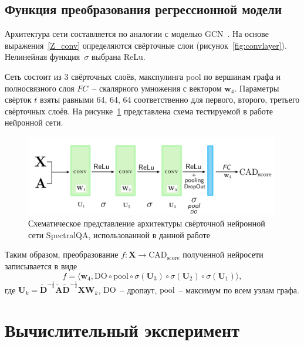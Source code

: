 \documentclass[14pt]{extarticle}
\begin{document}
\subsection{Функция преобразования регрессионной модели}
Архитектура сети составляется по аналогии с моделью GCN~\cite{kipf_semi-supervised_2017}. На основе выражения~\eqref{Z_conv} определяются свёрточные слои (рисунок~\ref{fig:convlayer}). Нелинейная функция~$\sigma$ выбрана ReLu.

Сеть состоит из 3 свёрточных слоёв, макспулинга $\text{pool}$ по вершинам графа и полносвязного слоя $FC$~-- скалярного умножения с вектором $\mathbf{w}_4$. Параметры свёрток $t$ взяты равными 64, 64, 64 соответственно для первого, второго, третьего свёрточных слоёв. На рисунке~\ref{fig:scheme} представлена схема тестируемой в работе нейронной сети.
\begin{figure}[h]
	\centering
	\includegraphics[width=0.99\textwidth]{net.pdf}
	\caption{Схематическое представление архитектуры свёрточной нейронной сети SpectralQA, использованной в данной работе}
	\label{fig:scheme}
\end{figure}

Таким образом, преобразование $f: \mathbf{X} \rightarrow \text{CAD}_\text{score}$ полученной нейросети записывается в виде
$$f = \langle \mathbf{w}_4, \text{DO} \circ \text{pool} \circ \sigma \left(\mathbf{U}_3\right) \circ\sigma\left( \mathbf{U}_2\right)\circ\sigma\left( \mathbf{U}_1\right)\rangle,$$
где $\mathbf{U}_k= \tilde{\mathbf{D}}^{-\frac{1}{2}} \tilde{\mathbf{A}}\tilde{\mathbf{D}}^{-\frac{1}{2}} \mathbf{X} \mathbf{W}_k$, $\text{DO}$~-- дропаут, $\text{pool}$~-- максимум по всем узлам графа.

\section{Вычислительный эксперимент}
\end{document}
